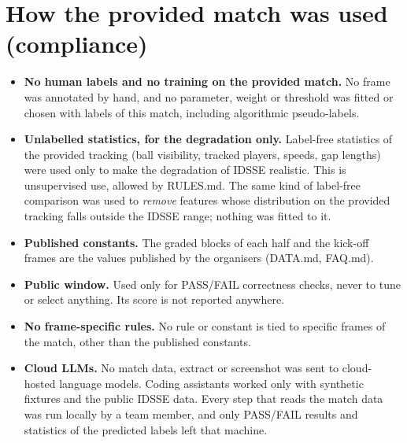 \documentclass[journal]{IEEEtran}
\begin{document}
\section{How the provided match was used (compliance)}
\label{sec:compliance}

\begin{itemize}
\item \textbf{No human labels and no training on the provided match.} No frame was annotated by hand, and no parameter, weight or threshold was fitted or chosen with labels of this match, including algorithmic pseudo-labels.
\item \textbf{Unlabelled statistics, for the degradation only.} Label-free statistics of the provided tracking (ball visibility, tracked players, speeds, gap lengths) were used only to make the degradation of IDSSE realistic. This is unsupervised use, allowed by RULES.md. The same kind of label-free comparison was used to \emph{remove} features whose distribution on the provided tracking falls outside the IDSSE range; nothing was fitted to it.
\item \textbf{Published constants.} The graded blocks of each half and the kick-off frames are the values published by the organisers (DATA.md, FAQ.md).
\item \textbf{Public window.} Used only for PASS/FAIL correctness checks, never to tune or select anything. Its score is not reported anywhere.
\item \textbf{No frame-specific rules.} No rule or constant is tied to specific frames of the match, other than the published constants.
\item \textbf{Cloud LLMs.} No match data, extract or screenshot was sent to cloud-hosted language models. Coding assistants worked only with synthetic fixtures and the public IDSSE data. Every step that reads the match data was run locally by a team member, and only PASS/FAIL results and statistics of the predicted labels left that machine.
\end{itemize}
\end{document}

